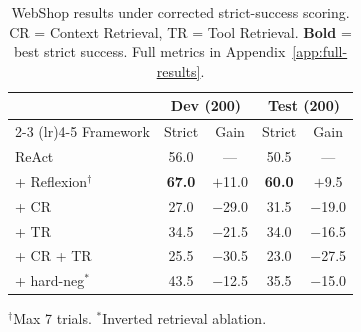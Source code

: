 \begin{table}[t]
\centering
\small
\caption{WebShop results under corrected strict-success scoring. CR = Context Retrieval, TR = Tool Retrieval. \textbf{Bold} = best strict success. Full metrics in Appendix~\ref{app:full-results}.}
\label{tab:webshop}
\begin{tabular}{lcccc}
\toprule
 & \multicolumn{2}{c}{\textbf{Dev} (200)} & \multicolumn{2}{c}{\textbf{Test} (200)} \\
\cmidrule(lr){2-3} \cmidrule(lr){4-5}
Framework & Strict & Gain & Strict & Gain \\
\midrule
ReAct                        & 56.0 & ---    & 50.5 & --- \\
+ Reflexion$^\dagger$        & \textbf{67.0} & $+$11.0 & \textbf{60.0} & $+$9.5 \\
+ CR                         & 27.0 & $-$29.0 & 31.5 & $-$19.0 \\
+ TR                         & 34.5 & $-$21.5 & 34.0 & $-$16.5 \\
+ CR + TR                    & 25.5 & $-$30.5 & 23.0 & $-$27.5 \\
+ hard-neg$^*$               & 43.5 & $-$12.5 & 35.5 & $-$15.0 \\
\bottomrule
\end{tabular}
\vspace{2pt}

{\footnotesize $^\dagger$Max 7 trials. $^*$Inverted retrieval ablation.}
\end{table}
